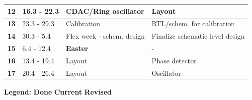 \documentclass[t, screen, aspectratio=43]{beamer}
\begin{document}
\begin{frame}
\begin{table}[htb!]
\begin{tabular}{|c|l|l|l|}
			\hline 
			\rule[-1ex]{0pt}{2.5ex}\textbf{12}&16.3 - 22.3& CDAC/Ring oscillator  & Layout\\ 
			\hline 
			\rule[-1ex]{0pt}{2.5ex}\textbf{13}&23.3 - 29.3& Calibration& RTL/schem. for calibration\\ 
			\hline 
			\rule[-1ex]{0pt}{2.5ex}\textbf{14}& 30.3 - 5.4 &  Flex week - schem. design & Finalize schematic level design\\ 
			\hline 
			\rule[-1ex]{0pt}{2.5ex}\textbf{15}& 6.4 - 12.4& {\color{red}\textbf{Easter}} & - \\ 
			\hline 
			\rule[-1ex]{0pt}{2.5ex}\textbf{16}& 13.4 - 19.4& Layout & Phase detector\\ 
			\hline 
			\rule[-1ex]{0pt}{2.5ex}\textbf{17}& 20.4 - 26.4& Layout & Oscillator\\ 
			\hline 
		\end{tabular}
		\begin{flushleft}\textbf{Legend:} \colorbox{red!20}{\textbf{Done}} \colorbox{green!20}{\textbf{Current}}  \colorbox{blue!20}{\textbf{Revised}}
		\end{flushleft}
	\end{table}   
\end{frame}
\end{document}
